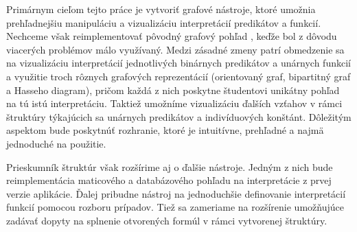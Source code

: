 Primárnym cieľom tejto práce je vytvoriť grafové nástroje, ktoré umožnia prehľadnejšiu manipuláciu a vizualizáciu interpretácií predikátov a funkcií. Nechceme však reimplementovať pôvodný grafový pohľad \cite{baluch2020}, keďže bol z dôvodu viacerých problémov málo využívaný. Medzi zásadné zmeny patrí obmedzenie sa na vizualizáciu interpretácií jednotlivých binárnych predikátov a unárnych funkcií a využitie troch rôznych grafových reprezentácií (orientovaný graf, bipartitný graf a Hasseho diagram), pričom každá z nich poskytne študentovi unikátny pohľad na tú istú interpretáciu. Taktiež umožníme vizualizáciu ďalších vzťahov v rámci štruktúry týkajúcich sa unárnych predikátov a indivíduových konštánt. Dôležitým aspektom bude poskytnúť rozhranie, ktoré je intuitívne, prehľadné a najmä jednoduché na použitie.

Prieskumník štruktúr však rozšírime aj o ďalšie nástroje. Jedným z nich bude reimplementácia maticového a databázového pohľadu na interpretácie z prvej verzie aplikácie. Ďalej pribudne nástroj na jednoduchšie definovanie interpretácií funkcií pomocou rozboru prípadov. Tiež sa zameriame na rozšírenie umožňujúce zadávať dopyty na splnenie otvorených formúl v rámci vytvorenej štruktúry.







